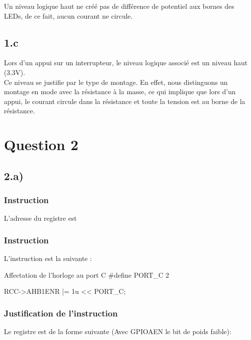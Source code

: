 Un niveau logique haut ne créé pas de différence de potentiel aux bornes des LEDs, de ce fait, aucun courant ne circule.
  
\subsection{1.c}

Lors d'un appui sur un interrupteur, le niveau logique associé est un niveau haut (3.3V). \\
Ce niveau se justifie par le type de montage. En effet, nous distinguons un montage en mode  
avec la résistance à la masse, ce qui implique que lors d'un appui, le courant circule dans
la résistance et toute la tension est au borne de la résistance.


\section{Question 2}

\subsection{2.a)}
\subsubsection*{Instruction}
L'adresse du registre  est 

\subsubsection{Instruction}
L'instruction est la suivante : 

\begin{Cpp}{Affectation de l'horloge au port C}
#define PORT_C 2

RCC->AHB1ENR |= 1u << PORT_C;	
\end{Cpp}
\subsubsection{Justification de l'instruction}

Le registre  est de la forme suivante (Avec GPIOAEN le bit de poids faible): \\
     \\
    \quad\quad \quad\quad {}   \quad\quad \quad\quad          {}    \quad\quad \quad\quad  {}    \quad\quad \quad\quad{}\\



